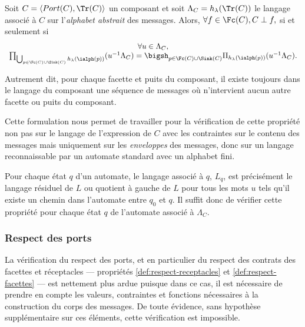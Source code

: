 \begin{prop}
Soit $C=\langle Port(C),\Tr(C) \rangle$ un composant et soit
$\Lambda_C=h_\lambda(\Tr(C))$ le langage associ\'e \`a $C$ sur l'\emph{alphabet
abstrait} des messages. Alors,  $ \forall f \in \Fc(C),C\perp f,$ si et seulement si
\begin{equation}
    \begin{array}{c}
        \forall u \in \Lambda_C, \\
        \prod_{\bigcup_{p\in \Fc(C)\cup \Sink(C)}h_\lambda(\ialph(p))}(u^{-1}\Lambda_C) =
        \bigsh_{p \in \Fc(C) \cup \Sink(C)} \Pi_{h_\lambda(\ialph(p))}(u^{-1}\Lambda_C).
    \end{array}\label{eq:prop-independance}
\end{equation}
\end{prop}
Autrement dit, pour chaque facette et puits du composant, il existe
toujours dans le langage du composant une s\'equence de messages
o\`u n'intervient aucun autre facette ou puits du composant. 

Cette formulation nous permet de travailler pour la v\'erification de cette
propri\'et\'e non pas sur le langage de l'expression de $C$ avec les contraintes sur le contenu des
messages mais uniquement sur les  \emph{enveloppes} des
messages, donc sur un langage reconnaissable par un automate
standard avec un alphabet fini. 

Pour chaque \'etat $q$ d'un automate, le langage associ\'e \`a $q$,
$L_q$, est pr\'ecis\'ement le langage r\'esiduel de $L$ ou quotient
\`a gauche  de $L$ pour tous les mots $u$ tels qu'il existe un chemin
dans l'automate entre $q_0$ et $q$. Il suffit donc de v\'erifier cette
propri\'et\'e pour chaque \'etat $q$ de l'automate associ\'e \`a $\Lambda_C$. 

\subsubsection{Respect des ports}

La v\'erification du respect des ports, et en particulier du respect
des contrats des facettes et r\'eceptacles --- propri\'et\'es
\ref{def:respect-receptacles} et \ref{def:respect-facettes} --- est
nettement plus ardue puisque dans ce cas, il est n\'ecessaire de
prendre en compte les valeurs, contraintes et  fonctions
n\'ecessaires \`a la construction du corps des messages. 
De toute \'evidence, sans hypoth\`ese suppl\'ementaire sur ces \'el\'ements, cette v\'erification est
impossible. 

